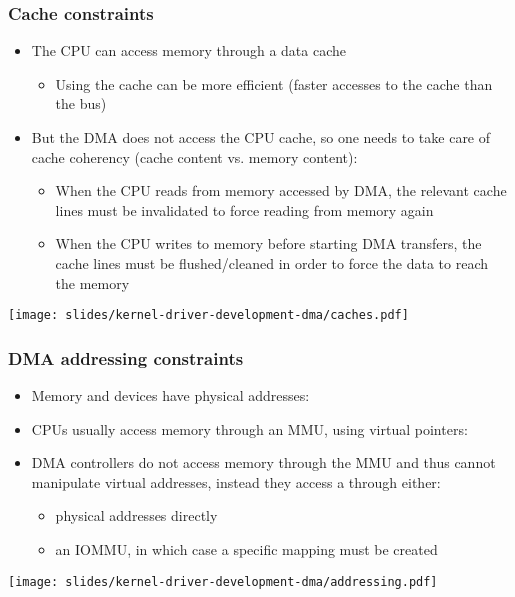 \begin{frame}
  \frametitle{Cache constraints}
  \begin{itemize}
  \item The CPU can access memory through a data cache
    \begin{itemize}
    \item Using the cache can be more efficient (faster accesses to
      the cache than the bus)
    \end{itemize}
  \item But the DMA does not access the CPU cache, so one needs to
    take care of cache coherency (cache content vs. memory content):
    \begin{itemize}
    \item When the CPU reads from memory accessed by DMA, the relevant
      cache lines must be invalidated to force reading from memory
      again
    \item When the CPU writes to memory before starting DMA transfers,
      the cache lines must be flushed/cleaned in order to force the data
      to reach the memory
    \end{itemize}
  \end{itemize}
  \begin{center}
    \texttt{[image: slides/kernel-driver-development-dma/caches.pdf]}
  \end{center}
\end{frame}

\begin{frame}
  \frametitle{DMA addressing constraints}
  \begin{itemize}
  \item Memory and devices have physical addresses: 
  \item CPUs usually access memory through an MMU, using virtual
    pointers: 
  \item DMA controllers do not access memory through the MMU and thus
    cannot manipulate virtual addresses, instead they access a
     through either:
    \begin{itemize}
    \item physical addresses directly
    \item an IOMMU, in which case a specific mapping must be created
    \end{itemize}
  \end{itemize}
  \begin{center}
    \texttt{[image: slides/kernel-driver-development-dma/addressing.pdf]}
  \end{center}
\end{frame}

